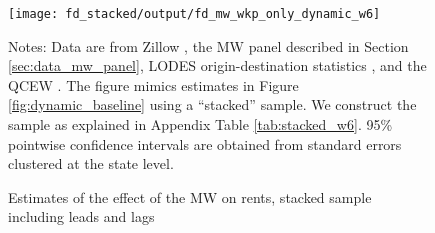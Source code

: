 
\begin{figure}[h!]
    \centering
    \caption{Estimates of the effect of the MW on rents, stacked sample including
             leads and lags}
    \label{fig:dynamic_stacked}

    \texttt{[image: fd\_stacked/output/fd\_mw\_wkp\_only\_dynamic\_w6]}

    \begin{minipage}{.95\textwidth} \footnotesize
        \vspace{3mm}
        Notes:
        Data are from Zillow \parencite{ZillowData},
        the MW panel described in Section \ref{sec:data_mw_panel},
        LODES origin-destination statistics \parencite{CensusLODES},
        and the QCEW \parencite{QCEW}.
        The figure mimics estimates in Figure \ref{fig:dynamic_baseline} 
        using a ``stacked'' sample.
        We construct the sample as explained in Appendix Table \ref{tab:stacked_w6}.
        95\% pointwise confidence intervals are obtained from standard errors 
        clustered at the state level.
    \end{minipage}
\end{figure}
